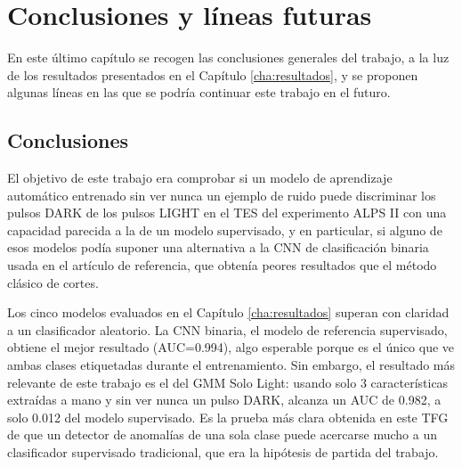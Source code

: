%
%
%
%
%
%
%
%

\chapter{Conclusiones y líneas futuras}
\label{cha:concl-y-line}

En este último capítulo se recogen las conclusiones generales del trabajo, a la luz de los resultados presentados en el Capítulo \ref{cha:resultados}, y se proponen algunas líneas en las que se podría continuar este trabajo en el futuro.

\section{Conclusiones}
\label{sec:conclusiones}

El objetivo de este trabajo era comprobar si un modelo de aprendizaje automático entrenado sin ver nunca un ejemplo de ruido puede discriminar los pulsos DARK de los pulsos LIGHT en el TES del experimento ALPS II con una capacidad parecida a la de un modelo supervisado, y en particular, si alguno de esos modelos podía suponer una alternativa a la CNN de clasificación binaria usada en el artículo de referencia, que obtenía peores resultados que el método clásico de cortes.

Los cinco modelos evaluados en el Capítulo \ref{cha:resultados} superan con claridad a un clasificador aleatorio. La CNN binaria, el modelo de referencia supervisado, obtiene el mejor resultado (AUC=0.994), algo esperable porque es el único que ve ambas clases etiquetadas durante el entrenamiento. Sin embargo, el resultado más relevante de este trabajo es el del GMM Solo Light: usando solo 3 características extraídas a mano y sin ver nunca un pulso DARK, alcanza un AUC de 0.982, a solo 0.012 del modelo supervisado. Es la prueba más clara obtenida en este TFG de que un detector de anomalías de una sola clase puede acercarse mucho a un clasificador supervisado tradicional, que era la hipótesis de partida del trabajo.

